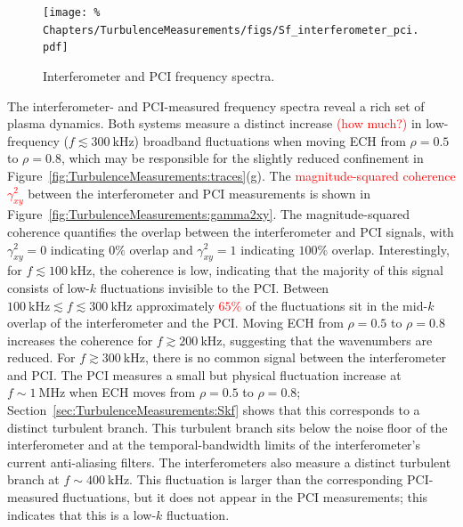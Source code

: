 \label{sec:TurbulenceMeasurements:Sf}
\begin{figure}
  \centering
  \texttt{[image: \%
    Chapters/TurbulenceMeasurements/figs/Sf\_interferometer\_pci.pdf]}
  \caption[Interferometer \& PCI frequency spectra]{%
    Interferometer and PCI frequency spectra.
  }
\label{fig:TurbulenceMeasurements:Sf_interferometer_pci}
\end{figure}

The interferometer- and PCI-measured frequency spectra
reveal a rich set of plasma dynamics.
Both systems measure a distinct increase \textcolor{red}{(how much?)}
in low-frequency ($f \lesssim \SI{300}{\kilo\hertz}$) broadband fluctuations
when moving ECH from $\rho = 0.5$ to $\rho = 0.8$,
which may be responsible for the slightly reduced confinement
in Figure~\ref{fig:TurbulenceMeasurements:traces}(g).
The \textcolor{red}{magnitude-squared coherence $\gamma^2_{xy}$}
between the interferometer and PCI measurements
is shown in Figure~\ref{fig:TurbulenceMeasurements:gamma2xy}.
The magnitude-squared coherence quantifies
the overlap between the interferometer and PCI signals,
with $\gamma^2_{xy} = 0$ indicating $0\%$ overlap and
$\gamma^2_{xy} = 1$ indicating $100\%$ overlap.
Interestingly, for $f \lesssim \SI{100}{\kilo\hertz}$,
the coherence is low,
indicating that the majority of this signal
consists of low-$k$ fluctuations invisible to the PCI.
Between $\SI{100}{\kilo\hertz} \lesssim f \lesssim \SI{300}{\kilo\hertz}$
approximately \textcolor{red}{$65\%$}
of the fluctuations sit in the mid-$k$ overlap
of the interferometer and the PCI.
\graffito{\textcolor{red}{better explanation}}
Moving ECH from $\rho = 0.5$ to $\rho = 0.8$
increases the coherence for $f \gtrsim \SI{200}{\kilo\hertz}$,
suggesting that the wavenumbers are reduced.
For $f \gtrsim \SI{300}{\kilo\hertz}$,
there is no common signal between the interferometer and PCI.
The PCI measures a small but physical fluctuation increase
at $f \sim \SI{1}{\mega\hertz}$
when ECH moves from $\rho = 0.5$ to $\rho = 0.8$;
Section~\ref{sec:TurbulenceMeasurements:Skf}
shows that this corresponds to a distinct turbulent branch.
This turbulent branch sits
below the noise floor of the interferometer and
at the temporal-bandwidth limits of the interferometer's
current anti-aliasing filters.
The interferometers also measure
a distinct turbulent branch at $f \sim \SI{400}{\kilo\hertz}$.
This fluctuation is larger than
the corresponding PCI-measured fluctuations,
but it does not appear in the PCI measurements;
this indicates that this is a low-$k$ fluctuation.

